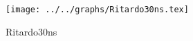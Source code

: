 \begin{figure}[h] \centering\texttt{[image: ../../graphs/Ritardo30ns.tex]}\caption{Ritardo30ns}\label{gr:Ritardo30ns} \end{figure}
